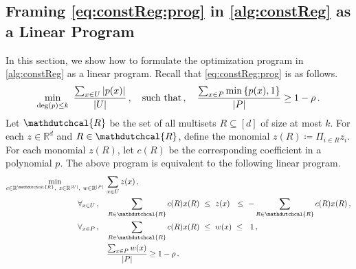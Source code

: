 \documentclass[11pt]{article}
\theoremstyle{plain}
\theoremstyle{definition}
\theoremstyle{remark}
\def\abs#1{\left| #1 \right|}
\newcommand{\inbrace}[1]{\left\{#1\right\}}
\newcommand{\R}{\mathbb{R}}
\newcommand{\hypo}[1]{\mathdutchcal{#1}}
\begin{document}
        
            
        
    \subsection{Framing \cref{eq:constReg:prog} in \cref{alg:constReg} as a Linear Program}\label{sec:module:linearProgram}
            In this section, we show how to formulate the optimization program in \cref{alg:constReg} as a linear program. 
            Recall that \cref{eq:constReg:prog} is as follows.
            \[
                \min_{{\rm deg}(p)\leq k}~\frac{\sum_{x\in U} \abs{{p(x)}}}{\abs{U}}
                    \,,\quad 
                    \text{such that}\,,\quad 
                    {\frac{\sum_{x\in P} \min\inbrace{p(x), 1}}{\abs{P}} \geq {1-\rho}} \,.
            \]
            Let $\hypo{R}$ be the set of all multisets $R\subseteq [d]$ of size at most $k$.
            For each $z\in \R^d$ and $R\in \hypo{R}$, define the monomial $z(R)\coloneqq \Pi_{i\in R} z_i$.
            For each monomial $z(R)$, let $c(R)$ be the corresponding coefficient in a polynomial $p$.
            The above program is equivalent to the following linear program.
            \begin{align*} 
                \min_{c\in \R^{\hypo{R}},\ z\in \R^{\abs{U}},\ w\in \R^{\abs{P}}}~
                    & {\sum_{x\in U} z(x)} \,,\\
                \forall_{x\in U}\,,\quad& \sum_{R\in \hypo{R}} c(R) x(R) ~\leq~ z(x) ~~\leq~ -\sum_{R\in \hypo{R}} c(R) x(R)\,,\\
                \forall_{x\in P}\,,\quad& \sum_{R\in \hypo{R}} c(R) x(R)~\leq~ w(x) ~\leq~ ~ 1\,,\\
                & {\frac{\sum_{x\in P} w(x)}{\abs{P}} \geq {1-\rho}}\,.
            \end{align*} 
    
    
\end{document}
